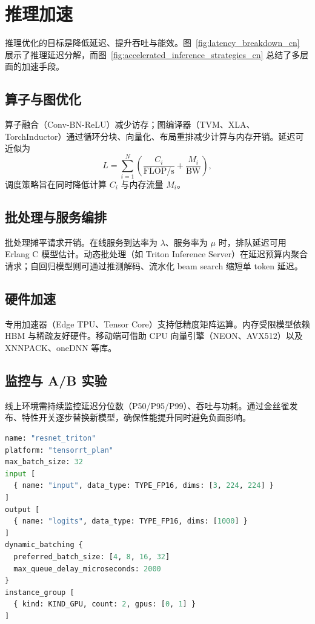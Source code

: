 \documentclass[UTF8,zihao=-4]{ctexart}
\begin{document}
\section{推理加速}
推理优化的目标是降低延迟、提升吞吐与能效。图~\ref{fig:latency_breakdown_cn} 展示了推理延迟分解，而图~\ref{fig:accelerated_inference_strategies_cn} 总结了多层面的加速手段。

\subsection{算子与图优化}
算子融合（Conv-BN-ReLU）减少访存；图编译器（TVM、XLA、TorchInductor）通过循环分块、向量化、布局重排减少计算与内存开销。延迟可近似为
\begin{equation}
  L = \sum_{i=1}^{N} \left(\frac{C_i}{\mathrm{FLOP/s}} + \frac{M_i}{\mathrm{BW}}\right),
\end{equation}
调度策略旨在同时降低计算 $C_i$ 与内存流量 $M_i$。

\subsection{批处理与服务编排}
批处理摊平请求开销。在线服务到达率为 $\lambda$、服务率为 $\mu$ 时，排队延迟可用 Erlang C 模型估计。动态批处理（如 Triton Inference Server）在延迟预算内聚合请求；自回归模型则可通过推测解码、流水化 beam search 缩短单 token 延迟。

\subsection{硬件加速}
专用加速器（Edge TPU、Tensor Core）支持低精度矩阵运算。内存受限模型依赖 HBM 与稀疏友好硬件。移动端可借助 CPU 向量引擎（NEON、AVX512）以及 XNNPACK、oneDNN 等库。

\subsection{监控与 A/B 实验}
线上环境需持续监控延迟分位数（P50/P95/P99）、吞吐与功耗。通过金丝雀发布、特性开关逐步替换新模型，确保性能提升同时避免负面影响。

\begin{lstlisting}[language=Python, caption={Triton Inference Server 动态批处理配置示例。}]
name: "resnet_triton"
platform: "tensorrt_plan"
max_batch_size: 32
input [
  { name: "input", data_type: TYPE_FP16, dims: [3, 224, 224] }
]
output [
  { name: "logits", data_type: TYPE_FP16, dims: [1000] }
]
dynamic_batching {
  preferred_batch_size: [4, 8, 16, 32]
  max_queue_delay_microseconds: 2000
}
instance_group [
  { kind: KIND_GPU, count: 2, gpus: [0, 1] }
]
\end{lstlisting}
\end{document}
